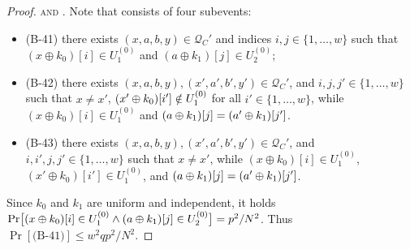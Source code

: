 \begin{proof}

\noindent \textsc{\bfour and \bfive}.
%
Note that \bfour consists of four subevents:
\begin{itemize}
	\item(B-41) there exists $(x,a,b,y) \in \mathcal{Q}_{C}'$ and indices $i, j \in \{1, \ldots, w\}$ such that $\left(x \oplus k_{0}\right)[i]\in U_1^{(0)}$ and $\left(a\oplus k_{1}\right)[j]\in U_2^{(0)}$;
	\item(B-42) there exists $(x,a,b,y),(x',a',b',y')\in\mathcal{Q}_{C}'$, and $i,j,j'\in\{1,\ldots,w\}$ such that $x\neq x'$, $(x'\oplus k_0)[i']\notin U_1^{(0)}$ for all $i'\in\{1,\ldots,w\}$, while $\left(x \oplus k_{0}\right)[i]\in U_1^{(0)}$ and $(a\oplus k_1)[j]=(a'\oplus k_1)[j']$.
	\item(B-43) there exists $(x,a,b,y),(x',a',b',y')\in\mathcal{Q}_{C}'$, and $i,i',j,j'\in\{1,\ldots,w\}$ such that $x\neq x'$, while $\left(x \oplus k_{0}\right)[i]\in U_1^{(0)}$, $\left(x' \oplus k_{0}\right)[i']\in U_1^{(0)}$, and $(a\oplus k_1)[j]=(a'\oplus k_1)[j']$.
\end{itemize}
Since $k_0$ and $k_1$ are uniform and independent, it holds ${\Pr}\big[(x\oplus k_0)[i]\in U_1^{(0)}\wedge(a\oplus k_1)[j]\in U_2^{(0)}\big]=p^2/N^2$. Thus $\Pr[\text{(B-41)}]\leq w^2qp^2/N^2$.







\end{proof}
